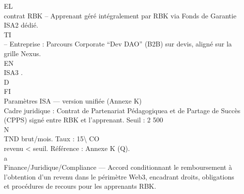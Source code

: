 \documentclass[12pt,landscape,a4paper]{article}
\begin{document}
\vspace{0.5em}
\vspace{0.5em}
\vspace{0.5em}
\vspace{0.5em}
EL\\
contrat RBK – Apprenant géré intégralement par RBK via Fonds de Garantie ISA2 dédié.\\
\vspace{0.5em}
\vspace{0.5em}
\vspace{0.5em}
\vspace{0.5em}
TI\\
– Entreprise : Parcours Corporate “Dev DAO” (B2B) sur devis, aligné sur la grille Nexus.\\
\vspace{0.5em}
\vspace{0.5em}
\vspace{0.5em}
\vspace{0.5em}
EN\\
ISA3 .\\
\vspace{0.5em}
\vspace{0.5em}
\vspace{0.5em}
\vspace{0.5em}
D\\
FI\\
Paramètres ISA — version unifiée (Annexe K)\\
\vspace{0.5em}
Cadre juridique : Contrat de Partenariat Pédagogiquea et de Partage de Succès (CPPS) signé entre RBK et l’apprenant. Seuil : 2 500\\
N\\
TND brut/mois. Taux : 15\textbackslash{}%
CO\\
revenu \textless{} seuil. Référence : Annexe K (Q).\\
a\\
Finance/Juridique/Compliance — Accord conditionnant le remboursement à l’obtention d’un revenu dans le périmètre Web3, encadrant droits, obligations\\
et procédures de recours pour les apprenants RBK.\\
\vspace{0.5em}
\vspace{0.5em}
\vspace{0.5em}
\vspace{0.5em}
\end{document}
